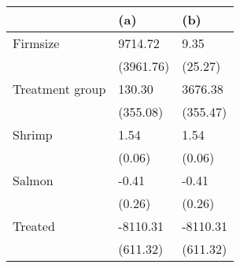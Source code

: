 \begin{tabular}{lll}
\toprule
{} &        (a) &       (b) \\
\midrule
Firmsize        &    9714.72 &      9.35 \\
                &  (3961.76) &   (25.27) \\
Treatment group &     130.30 &   3676.38 \\
                &   (355.08) &  (355.47) \\
Shrimp          &       1.54 &      1.54 \\
                &     (0.06) &    (0.06) \\
Salmon          &      -0.41 &     -0.41 \\
                &     (0.26) &    (0.26) \\
Treated         &   -8110.31 &  -8110.31 \\
                &   (611.32) &  (611.32) \\
\bottomrule
\end{tabular}
